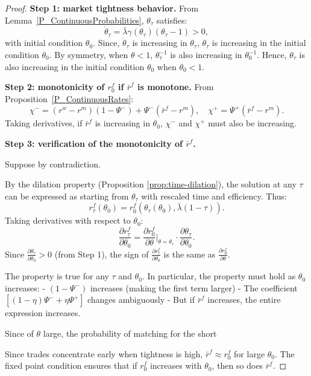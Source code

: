 \begin{proof}
\textbf{Step 1: market tightness behavior.} From Lemma~\ref{P_ContinuousProbabilities}, $\theta_{\tau}$ satisfies:
\[
\dot{\theta}_{\tau} = \bar{\lambda}\gamma(\theta_{\tau})(\theta_{\tau} - 1) > 0,
\]
with initial condition $\theta_0.$ Since, $\dot{\theta}_{\tau}$ is increasing in $\theta_{\tau}$, $\theta_{\tau}$ is increasing in the initial condition $\theta_0$. By symmetry, when $\theta<1$, $\theta_\tau^{-1}$ is also increasing in $\theta_0^{-1}$. Hence, $\theta_{\tau}$ is also increasing in the initial condition $\theta_0$ when $\theta_0<1.$ 

\textbf{Step 2: monotonicity of $r^{f}_0$ if $\bar{r}^{f}$ is monotone.} 
From Proposition~\ref{P_ContinuousRates}:
\[
\chi^{-} = (r^w - r^m)(1-\Psi^{-}) + \Psi^{-}(\bar{r}^f - r^m),\quad
\chi^{+} = \Psi^{+}(\bar{r}^f - r^m).
\]
Taking derivatives, if $\bar{r}^f$ is increasing in $\theta_0$, $\chi^{-}$ and $\chi^{+}$ must also be increasing. 

\textbf{Step 3: verification of the monotonicity of $\bar{r}^{f}$.} 

Suppose by contradiction. 

By the dilation property (Proposition \ref{prop:time-dilation}), the solution at any $\tau$ can be expressed as starting from $\theta_{\tau}$ with rescaled time and efficiency. Thus:
\[
r_{\tau}^f(\theta_0) = r_0^f(\theta_{\tau}(\theta_0), \bar{\lambda}(1-\tau)).
\]
Taking derivatives with respect to $\theta_0$:
\[
\frac{\partial r_{\tau}^f}{\partial \theta_0} = \frac{\partial r_0^f}{\partial \theta}\bigg|_{\theta=\theta_{\tau}} \cdot \frac{\partial \theta_{\tau}}{\partial \theta_0}.
\]
Since $\frac{\partial \theta_{\tau}}{\partial \theta_0} > 0$ (from Step 1), the sign of $\frac{\partial r_{\tau}^f}{\partial \theta_0}$ is the same as $\frac{\partial r_0^f}{\partial \theta}$. 



The property is true for any $\tau$ and $\theta_0$. In particular, the property must hold as $\theta_0$ increases:
- $(1-\Psi^{-})$ increases (making the first term larger)
- The coefficient $[(1-\eta)\Psi^{-} + \eta\Psi^{+}]$ changes ambiguously
- But if $\bar{r}^f$ increases, the entire expression increases. 

Since of $\theta$ large, the probability of matching for the short

Since trades concentrate early when tightness is high, $\bar{r}^f \approx r_0^f$ for large $\theta_0$. The fixed point condition ensures that if $r_0^f$ increases with $\theta_0$, then so does $\bar{r}^f$.


\end{proof}
